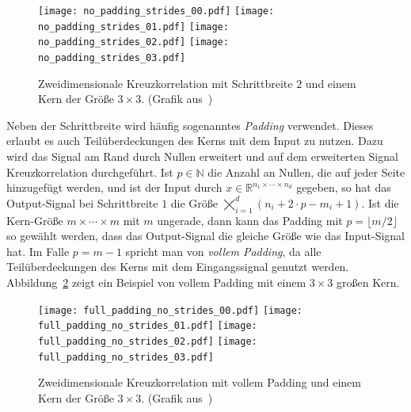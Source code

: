 \documentclass[paper=a4, 	%
		fontsize=11pt,
		abstract=true, 	%
		headsepline, 	%
		notitlepage	%
		]{scrartcl}
\theoremstyle{definition}
\newcommand{\R}{\mathbb{R}}
\newcommand{\N}{\mathbb{N}}
\begin{document}
\begin{figure}[ht]
    \centering
    \texttt{[image: no\_padding\_strides\_00.pdf]}
    \texttt{[image: no\_padding\_strides\_01.pdf]}
    \texttt{[image: no\_padding\_strides\_02.pdf]}
    \texttt{[image: no\_padding\_strides\_03.pdf]}
    \caption{Zweidimensionale Kreuzkorrelation mit Schrittbreite $2$ und einem Kern der Größe $3\times 3$. {\scriptsize (Grafik aus~\cite{dumoulin2016guide})}}
    \label{fig:cross-corr-with-stride}
\end{figure}

Neben der Schrittbreite wird häufig sogenanntes \emph{Padding} verwendet.
Dieses erlaubt es auch Teilüberdeckungen des Kerns mit dem Input zu nutzen.
Dazu wird das Signal am Rand durch Nullen erweitert und auf dem erweiterten Signal Kreuzkorrelation durchgeführt.
Ist $p\in\N$ die Anzahl an Nullen, die auf jeder Seite hinzugefügt werden, und ist der Input durch $x\in\R^{n_1\times\cdots\times n_d}$ gegeben, so hat das Output-Signal bei Schrittbreite $1$ die Größe $\bigtimes_{i=1}^d (n_i + 2\cdot p - m_i + 1)$.
Ist die Kern-Größe $m\times\cdots\times m$ mit $m$ ungerade, dann kann das Padding mit $p=\lfloor m/2 \rfloor$ so gewählt werden, dass das Output-Signal die gleiche Größe wie das Input-Signal hat.
Im Falle $p=m-1$ spricht man von \emph{vollem Padding}, da alle Teilüberdeckungen des Kerns mit dem Eingangssignal genutzt werden.
Abbildung~\ref{fig:cross-corr-with-padding} zeigt ein Beispiel von vollem Padding mit einem $3\times 3$ großen Kern.


\begin{figure}[ht]
    \centering
    \texttt{[image: full\_padding\_no\_strides\_00.pdf]}
    \texttt{[image: full\_padding\_no\_strides\_01.pdf]}
    \texttt{[image: full\_padding\_no\_strides\_02.pdf]}
    \texttt{[image: full\_padding\_no\_strides\_03.pdf]}
    \caption{Zweidimensionale Kreuzkorrelation mit vollem Padding und einem Kern der Größe $3\times 3$. {\scriptsize (Grafik aus~\cite{dumoulin2016guide})}}
    \label{fig:cross-corr-with-padding}
\end{figure}
\end{document}

